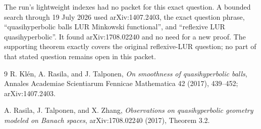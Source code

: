 \documentclass[11pt]{article}
\begin{document}
The run's lightweight indexes had no packet for this exact question.  A bounded
search through 19 July 2026 used arXiv:1407.2403, the exact question phrase,
``quasihyperbolic balls LUR Minkowski functional'', and ``reflexive LUR
quasihyperbolic''.  It found arXiv:1708.02240 and no need for a new proof.
The supporting theorem exactly covers the original reflexive-LUR question;
no part of that stated question remains open in this packet.

\begin{thebibliography}{9}
R. Kl\'en, A. Rasila, and J. Talponen,
\emph{On smoothness of quasihyperbolic balls},
Annales Academiae Scientiarum Fennicae Mathematica 42 (2017), 439--452;
arXiv:1407.2403.

A. Rasila, J. Talponen, and X. Zhang,
\emph{Observations on quasihyperbolic geometry modeled on Banach spaces},
arXiv:1708.02240 (2017), Theorem 3.2.
\end{thebibliography}
\end{document}
